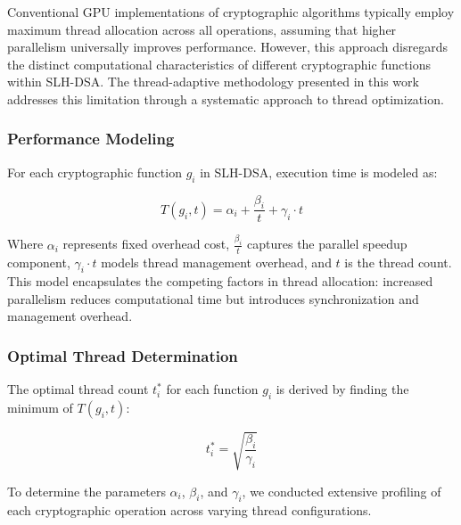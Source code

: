\documentclass[journal]{IEEEtran}
\begin{document}
Conventional GPU implementations of cryptographic algorithms typically employ maximum thread allocation across all operations, assuming that higher parallelism universally improves performance. However, this approach disregards the distinct computational characteristics of different cryptographic functions within SLH-DSA. The thread-adaptive methodology presented in this work addresses this limitation through a systematic approach to thread optimization.

\subsubsection{Performance Modeling}

For each cryptographic function $g_i$ in SLH-DSA, execution time is modeled as:

\begin{equation}
  T(g_i, t) = \alpha_i + \frac{\beta_i}{t} + \gamma_i \cdot t
\end{equation}

Where $\alpha_i$ represents fixed overhead cost, $\frac{\beta_i}{t}$ captures the parallel speedup component, $\gamma_i \cdot t$ models thread management overhead, and $t$ is the thread count. This model encapsulates the competing factors in thread allocation: increased parallelism reduces computational time but introduces synchronization and management overhead.

\subsubsection{Optimal Thread Determination}

The optimal thread count $t_i^*$ for each function $g_i$ is derived by finding the minimum of $T(g_i, t)$:

\begin{equation}
  t_i^* = \sqrt{\frac{\beta_i}{\gamma_i}}
\end{equation}

To determine the parameters $\alpha_i$, $\beta_i$, and $\gamma_i$, we conducted extensive profiling of each cryptographic operation across varying thread configurations.


\end{document}
